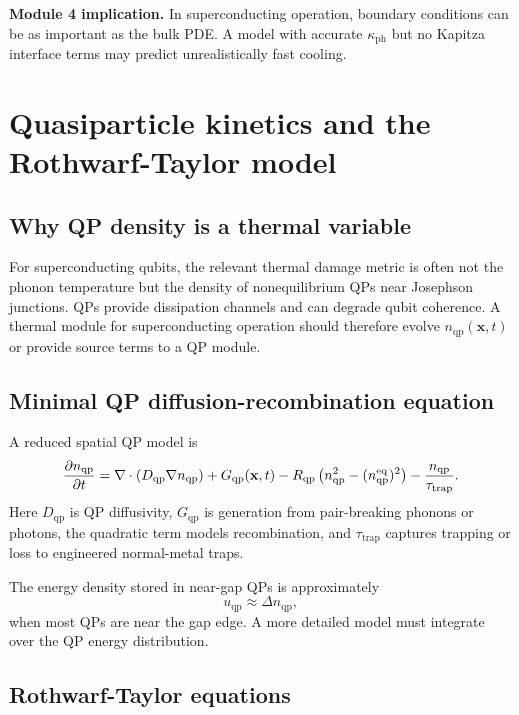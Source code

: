 \documentclass[11pt]{article}
\newcommand{\kappaph}{\kappa_{\mathrm{ph}}}
\newcommand{\nqp}{n_{\mathrm{qp}}}
\newcommand{\tautrap}{\tau_{\mathrm{trap}}}
\newcommand{\x}{\mathbf{x}}
\begin{document}
\begin{physicsbox}
\textbf{Module 4 implication.} In superconducting operation, boundary conditions can be as important as the bulk PDE. A model with accurate \(\kappaph\) but no Kapitza interface terms may predict unrealistically fast cooling.
\end{physicsbox}

\section{Quasiparticle kinetics and the Rothwarf-Taylor model}

\subsection{Why QP density is a thermal variable}

For superconducting qubits, the relevant thermal damage metric is often not the phonon temperature but the density of nonequilibrium QPs near Josephson junctions. QPs provide dissipation channels and can degrade qubit coherence. A thermal module for superconducting operation should therefore evolve \(\nqp(\x,t)\) or provide source terms to a QP module.

\subsection{Minimal QP diffusion-recombination equation}

A reduced spatial QP model is
\begin{equation}
\pdv{\nqp}{t}
=\nabla\cdot\left(D_{\mathrm{qp}}\nabla\nqp\right)
+G_{\mathrm{qp}}(\x,t)
-R_{\mathrm{qp}}\left(\nqp^2-(n_{\mathrm{qp}}^{\mathrm{eq}})^2\right)
-\frac{\nqp}{\tautrap}.
\label{eq:qp_diff_rec}
\end{equation}
Here \(D_{\mathrm{qp}}\) is QP diffusivity, \(G_{\mathrm{qp}}\) is generation from pair-breaking phonons or photons, the quadratic term models recombination, and \(\tautrap\) captures trapping or loss to engineered normal-metal traps.

The energy density stored in near-gap QPs is approximately
\begin{equation}
u_{\mathrm{qp}}\approx \Delta \nqp,
\label{eq:uqp_nqp}
\end{equation}
when most QPs are near the gap edge. A more detailed model must integrate over the QP energy distribution.

\subsection{Rothwarf-Taylor equations}
\end{document}
